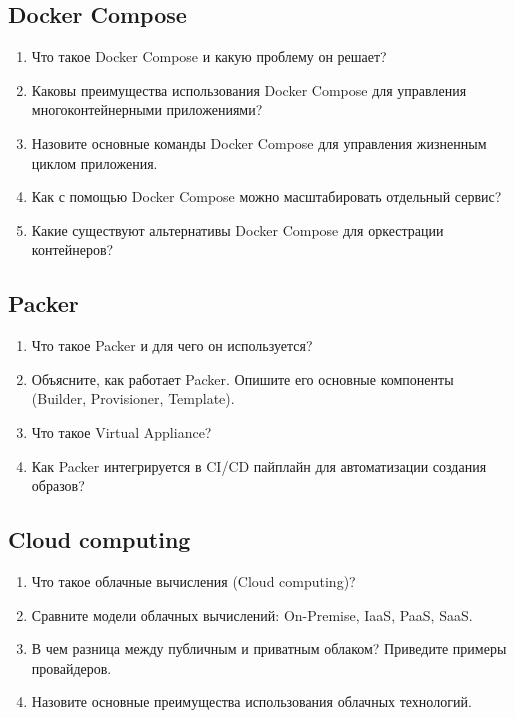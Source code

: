 \documentclass[12pt,a4paper]{article}
\begin{document}
    \subsection{Docker Compose}
    \begin{enumerate}
        \item Что такое Docker Compose и какую проблему он решает?
        \item Каковы преимущества использования Docker Compose для управления многоконтейнерными приложениями?
        \item Назовите основные команды Docker Compose для управления жизненным циклом приложения.
        \item Как с помощью Docker Compose можно масштабировать отдельный сервис?
        \item Какие существуют альтернативы Docker Compose для оркестрации контейнеров?
    \end{enumerate}

    \subsection{Packer}
    \begin{enumerate}
        \item Что такое Packer и для чего он используется?
        \item Объясните, как работает Packer. Опишите его основные компоненты (Builder, Provisioner, Template).
        \item Что такое Virtual Appliance?
        \item Как Packer интегрируется в CI/CD пайплайн для автоматизации создания образов?
    \end{enumerate}

    \subsection{Cloud computing}
    \begin{enumerate}
        \item Что такое облачные вычисления (Cloud computing)?
        \item Сравните модели облачных вычислений: On-Premise, IaaS, PaaS, SaaS.
        \item В чем разница между публичным и приватным облаком? Приведите примеры провайдеров.
        \item Назовите основные преимущества использования облачных технологий.
    \end{enumerate}
\end{document}
